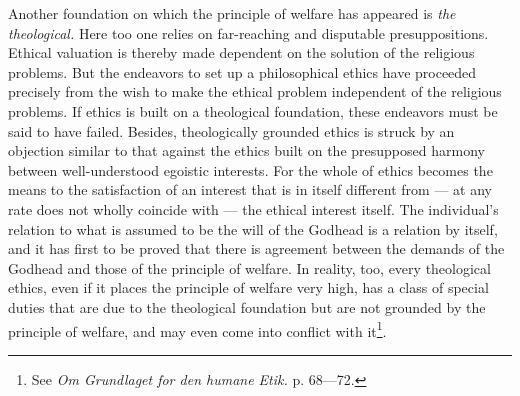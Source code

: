 \documentclass[12pt,a4paper,openany]{book}
\newcommand{\opage}[1]{\marginnote{\footnotesize\textit{[#1]}}}
\begin{document}
Another foundation on which the principle of welfare has appeared is \textit{the theological.} Here too
one relies on far-reaching and disputable presuppositions. Ethical valuation is thereby made dependent
on the solution of the religious problems. But the endeavors to set up a philosophical ethics have
proceeded precisely from the wish to make the ethical problem
\opage{57}independent of the religious problems. If ethics is built on a theological foundation, these
endeavors must be said to have failed. Besides, theologically grounded ethics is struck by an
objection similar to that against the ethics built on the presupposed harmony between well-understood
egoistic interests. For the whole of ethics becomes the means to the satisfaction of an interest that
is in itself different from --- at any rate does not wholly coincide with --- the ethical interest
itself. The individual's relation to what is assumed to be the will of the Godhead is a relation by
itself, and it has first to be proved that there is agreement between the demands of the Godhead and
those of the principle of welfare. In reality, too, every theological ethics, even if it places the
principle of welfare very high, has a class of special duties that are due to the theological
foundation but are not grounded by the principle of welfare, and may even come into conflict with
it\footnote[1]{See \textit{Om Grundlaget for den humane Etik.} p. 68---72.}.
\end{document}
